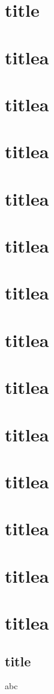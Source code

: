 \documentclass[compress]{beamer}
\begin{document}
\section{title}
\section{titlea}
\section{titlea}
\section{titlea}
\section{titlea}
\section{titlea}
\section{titlea}
\section{titlea}
\section{titlea}
\section{titlea}
\section{titlea}
\section{titlea}
\section{titlea}
\section{titlea}

\subsection{title}
\begin{frame}
    abc
\end{frame} 
\end{document}
